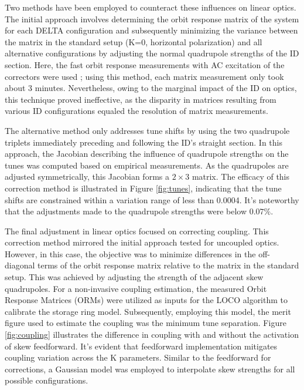 \documentclass[a4paper,
               keeplastbox,   %
               ]{jacow}
\begin{document}
Two methods have been employed to counteract these influences on linear optics. The initial approach involves determining the orbit response matrix of the system for each DELTA configuration and subsequently minimizing the variance between the matrix in the standard setup (K=0, horizontal polarization) and all alternative configurations by adjusting the normal quadrupole strengths of the ID section. Here, the fast orbit response measurements with AC excitation of the correctors were used \cite{Velloso:IPAC22-MOPOTK002}; using this method, each matrix measurement only took about $3$ minutes. Nevertheless, owing to the marginal impact of the ID on optics, this technique proved ineffective, as the disparity in matrices resulting from various ID configurations equaled the resolution of matrix measurements.

The alternative method only addresses tune shifts by using the two quadrupole triplets immediately preceding and following the ID's straight section. In this approach, the Jacobian describing the influence of quadrupole strengths on the tunes was computed based on empirical measurements. As the quadrupoles are adjusted symmetrically, this Jacobian forms a $2 \times 3$ matrix. The efficacy of this correction method is illustrated in Figure \ref{fig:tunes}, indicating that the tune shifts are constrained within a variation range of less than 0.0004. It's noteworthy that the adjustments made to the quadrupole strengths were below $0.07\%$.

The final adjustment in linear optics focused on correcting coupling. This correction method mirrored the initial approach tested for uncoupled optics. However, in this case, the objective was to minimize differences in the off-diagonal terms of the orbit response matrix relative to the matrix in the standard setup. This was achieved by adjusting the strength of the adjacent skew quadrupoles. For a non-invasive coupling estimation, the measured Orbit Response Matrices (ORMs) were utilized as inputs for the LOCO algorithm \cite{Safranek} to calibrate the storage ring model. Subsequently, employing this model, the merit figure used to estimate the coupling was the minimum tune separation. Figure \ref{fig:coupling} illustrates the difference in coupling with and without the activation of skew feedforward. It's evident that feedforward implementation mitigates coupling variation across the K parameters. Similar to the feedforward for corrections, a Gaussian model was employed to interpolate skew strengths for all possible configurations.
 
\end{document}
